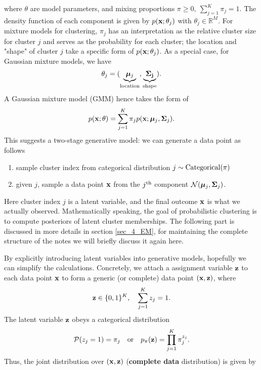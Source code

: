 \documentclass[../book-template.tex]{subfiles}
\begin{document}
where $\theta$ are model parameters, and mixing proportions $\pi \geq 0,\ \sum_{j=1}^{K}\pi_j=1$. The density function of each component is given by $p({\bf x};\theta_j)$ with $\theta_j\in\mathbb{R}^M$. For mixture models for clustering, $\pi_j$ has an interpretation as the relative cluster size for cluster $j$ and serves as the probability for each cluster; the location and "shape" of cluster $j$ take a specific form of $p({\bf x};\theta_j)$. As a special case, for Gaussian mixture models, we have 
\begin{equation*}
	\theta_j=(\underbrace{\bm{\mu}_j}_{\rm location},\underbrace{{\bf \Sigma_j}}_{\rm shape}).
\end{equation*}
A Gaussian mixture model (GMM) hence takes the form of
\begin{equation*}
	p({\bf x};\theta)=\sum_{j=1}^{K}\pi_j p({\bf x};\bm{\mu}_j,{\bf \Sigma}_j).
\end{equation*}
This suggests a two-stage generative model: we can generate a data point as follows
\begin{enumerate}
	\item sample cluster index from categorical distribution $j\sim {\rm Categorical}(\pi)$
	\item given $j$, sample a data point ${\bf x}$ from the $j^{\rm th}$ component $\mathcal{N}(\bm{\mu}_j,{\bf \Sigma}_j)$.
\end{enumerate}
Here cluster index $j$ is a latent variable, and the final outcome ${\bf x}$ is what we actually observed. Mathematically speaking, the goal of probabilistic clustering is to compute posteriors of latent cluster memberships. The following part is discussed in more details in section \ref{sec_4_EM}, for maintaining the complete structure of the notes we will briefly discuss it again here.
\par By explicitly introducing latent variables into generative models, hopefully we can simplify the calculations. Concretely, we attach a assignment variable ${\bf z}$ to each data point ${\bf x}$ to form a generic (or complete) data point $({\bf x,z})$, where
\begin{equation*}
	{\bf z}\in\{0,1\}^{K},\quad \sum_{j=1}^{K}z_j=1.
\end{equation*}
The latent variable ${\bf z}$ obeys a categorical distribution
\begin{equation*}
	\mathcal{P}(z_j=1)=\pi_j\quad {\rm or}\quad p_{\pi}({\bf z}) =\prod_{j=1}^{K}\pi_j^{z_j}.
\end{equation*}
Thus, the joint distribution over $({\bf x, z})$ (\textbf{complete data} distribution) is given by
\end{document}
